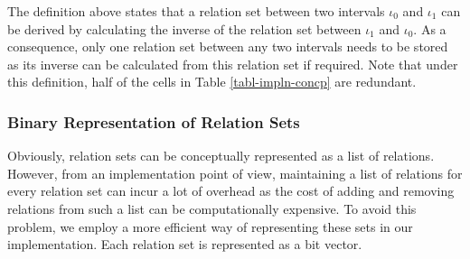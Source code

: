 \documentclass[11pt]{report}
\begin{document}
        The definition above states that a relation set between two intervals
        $\iota_0$ and $\iota_1$ can be derived by calculating the inverse of
        the relation set between $\iota_1$ and $\iota_0$. As a consequence,
        only one relation set between any two intervals needs to be stored
        as its inverse can be calculated from this relation set if required.
        Note that under this definition, half of the cells in Table
        \ref{tabl-impln-concp} are redundant.

        \subsubsection{Binary Representation of Relation Sets}

          Obviously, relation sets can be conceptually represented as a list of
          relations. However, from an implementation point of view, maintaining
          a list of relations for every relation set can incur a lot of
          overhead as the cost of adding and removing relations from such a
          list can be computationally expensive. To avoid this problem, we
          employ a more efficient way of representing these sets in our
          implementation. Each relation set is represented as a bit
          vector\footnotemark.

\end{document}
